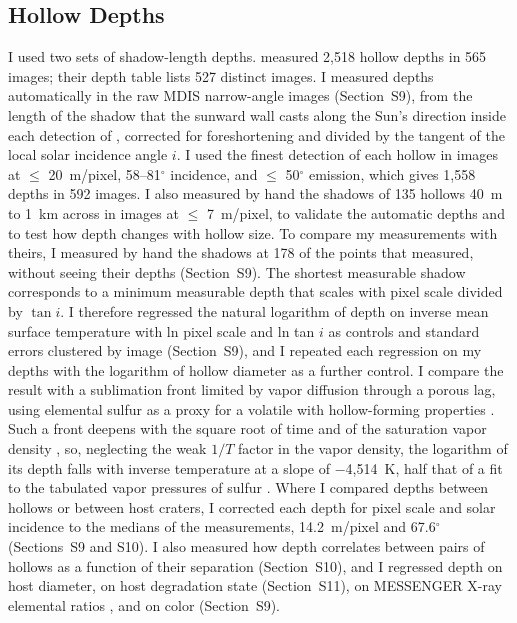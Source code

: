 \documentclass[article,review]{planetary}
\begin{document}
\subsection{Hollow Depths}
\label{sec:depthmethods}
I used two sets of shadow-length depths. \textcite{blewett2016} measured 2,518 hollow depths in 565 images; their depth table lists 527 distinct images. I measured depths automatically in the raw MDIS narrow-angle images (Section~S9), from the length of the shadow that the sunward wall casts along the Sun's direction inside each detection of \textcite{bickel2025}, corrected for foreshortening and divided by the tangent of the local solar incidence angle $i$. I used the finest detection of each hollow in images at $\leq$ 20~m/pixel, 58--81$^\circ$ incidence, and $\leq$ 50$^\circ$ emission, which gives 1,558 depths in 592 images. I also measured by hand the shadows of 135 hollows 40~m to 1~km across in images at $\leq$ 7~m/pixel, to validate the automatic depths and to test how depth changes with hollow size. To compare my measurements with theirs, I measured by hand the shadows at 178 of the points that \textcite{blewett2016} measured, without seeing their depths (Section~S9). The shortest measurable shadow corresponds to a minimum measurable depth that scales with pixel scale divided by $\tan i$. I therefore regressed the natural logarithm of depth on inverse mean surface temperature with ln pixel scale and ln tan $i$ as controls and standard errors clustered by image (Section~S9), and I repeated each regression on my depths with the logarithm of hollow diameter as a further control. I compare the result with a sublimation front limited by vapor diffusion through a porous lag, using elemental sulfur as a proxy for a volatile with hollow-forming properties \parencite{phillips2021}. Such a front deepens with the square root of time and of the saturation vapor density \parencite{schorghofer2018}, so, neglecting the weak $1/T$ factor in the vapor density, the logarithm of its depth falls with inverse temperature at a slope of $-$4,514~K, half that of a fit to the tabulated vapor pressures of sulfur \parencite{lide2007}. Where I compared depths between hollows or between host craters, I corrected each depth for pixel scale and solar incidence to the medians of the measurements, 14.2~m/pixel and 67.6$^\circ$ (Sections~S9 and S10). I also measured how depth correlates between pairs of hollows as a function of their separation (Section~S10), and I regressed depth on host diameter, on host degradation state (Section~S11), on MESSENGER X-ray elemental ratios \parencite[Section~S9;][]{nittler2020}, and on color (Section~S9).
\end{document}

